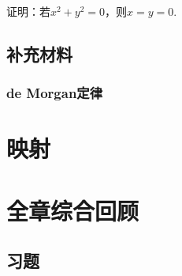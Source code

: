 \documentclass[lang=cn,math=cm,chinesefont=nofont,11pt,scheme=chinese,onecol]{elegantbook}
\begin{document}
\begin{exercise}\label{2003RJA_xx2-1_P7.exp4}
  证明：若$x^2+y^2=0$，则$x=y=0$.
\end{exercise}

\subsection{补充材料}

\subsubsection{de Morgan定律}

\section{映射}

\section{全章综合回顾}

\subsection{习题}
\end{document}
